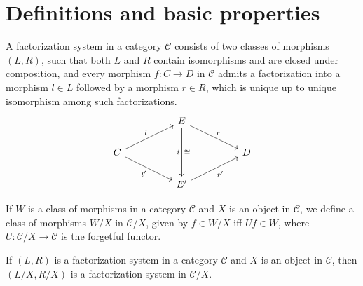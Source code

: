 %
\section*{Definitions and basic properties}

\begin{definition}
  A factorization system in a category $\mathcal{C}$ consists of two classes of morphisms $(L,R)$, such that both $L$ and $R$ contain isomorphisms and are closed under composition, and every morphism $f: C \to D$ in $\mathcal{C}$ admits a factorization into a morphism $l\in L$ followed by a morphism $r\in R$, which is unique up to unique isomorphism among such factorizations.
  \[\begin{tikzcd}
  	&& E \\
  	C &&&& D \\
  	&& {E'}
  	\arrow["r", from=1-3, to=2-5]
  	\arrow["i"', from=1-3, to=3-3]
  	\arrow["\cong", from=1-3, to=3-3]
  	\arrow["l", from=2-1, to=1-3]
  	\arrow["{l'}"', from=2-1, to=3-3]
  	\arrow["{r'}"', from=3-3, to=2-5]
  \end{tikzcd}\]
\end{definition}

\begin{definition}
  If $W$ is a class of morphisms in a category $\mathcal{C}$ and $X$ is an object in $\mathcal{C}$, we define a class of morphisms $W/X$ in $\mathcal{C}/X$, given by $f \in W/X$ iff $U f \in W$, where $U : \mathcal{C}/X \to \mathcal{C}$ is the forgetful functor.
\end{definition}

\begin{lemma}
  If $(L,R)$ is a factorization system in a category $\mathcal{C}$ and $X$ is an object in $\mathcal{C}$, then $(L/X,R/X)$ is a factorization system in $\mathcal{C}/X$.
\end{lemma}

